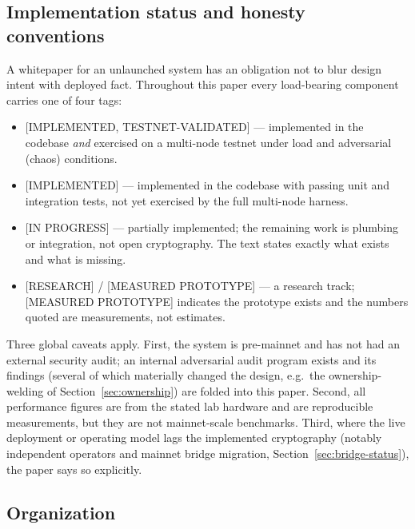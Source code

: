 \documentclass[11pt]{article}
\newcommand{\statusI}{\textcolor{statgreen}{\textsf{\scriptsize[IMPLEMENTED]}}}
\newcommand{\statusV}{\textcolor{statgreen}{\textsf{\scriptsize[IMPLEMENTED, TESTNET-VALIDATED]}}}
\newcommand{\statusP}{\textcolor{statblue}{\textsf{\scriptsize[IN PROGRESS]}}}
\newcommand{\statusR}{\textcolor{statred}{\textsf{\scriptsize[RESEARCH]}}}
\newcommand{\statusM}{\textcolor{statblue}{\textsf{\scriptsize[MEASURED PROTOTYPE]}}}
\theoremstyle{plain}
\theoremstyle{definition}
\theoremstyle{remark}
\begin{document}
\subsection{Implementation status and honesty conventions}
\label{sec:status}

A whitepaper for an unlaunched system has an obligation not to blur design
intent with deployed fact. Throughout this paper every load-bearing component
carries one of four tags:

\begin{itemize}[leftmargin=1.6em]
\item \statusV{} --- implemented in the codebase \emph{and} exercised on a
  multi-node testnet under load and adversarial (chaos) conditions.
\item \statusI{} --- implemented in the codebase with passing unit and
  integration tests, not yet exercised by the full multi-node harness.
\item \statusP{} --- partially implemented; the remaining work is plumbing or
  integration, not open cryptography. The text states exactly what exists and
  what is missing.
\item \statusR{} / \statusM{} --- a research track; \statusM{} indicates the
  prototype exists and the numbers quoted are measurements, not estimates.
\end{itemize}

Three global caveats apply. First, the system is pre-mainnet and has not had an
external security audit; an internal adversarial audit program exists and its
findings (several of which materially changed the design, e.g.\ the
ownership-welding of Section~\ref{sec:ownership}) are folded into this paper.
Second, all performance figures are from the stated lab hardware and are
reproducible measurements, but they are not mainnet-scale benchmarks. Third,
where the live deployment or operating model lags the implemented cryptography
(notably independent operators and mainnet bridge migration,
Section~\ref{sec:bridge-status}), the paper says so explicitly.

\subsection{Organization}
\end{document}
